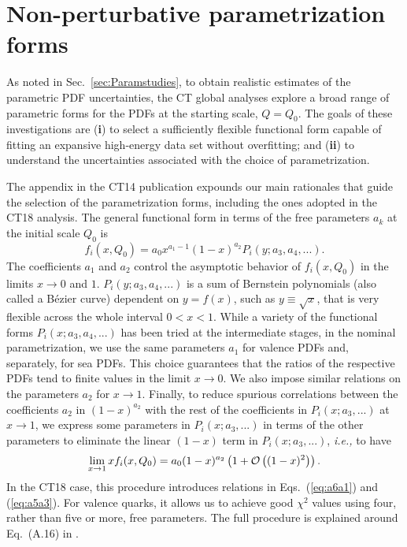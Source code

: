 \section{Non-perturbative parametrization forms}
\label{sec:AppendixParam}

As noted in Sec.~\ref{sec:Paramstudies}, to obtain realistic estimates of the parametric PDF uncertainties, the CT global analyses explore a broad range of parametric forms for the PDFs at the starting scale, $Q\! =\! Q_0$. 
The goals of these investigations are ({\bf i}) to select a sufficiently flexible functional form capable of fitting an expansive high-energy data set without overfitting; and ({\bf ii}) to understand the uncertainties associated with the choice of parametrization. 

The appendix in the CT14 publication \cite{Dulat:2015mca} expounds our main rationales that guide the selection of the parametrization forms, including the ones adopted in the CT18 analysis. The general functional form in terms of the free parameters $a_k$ at the initial scale $Q_0$ is
\begin{equation}
    f_i(x,Q_0) = a_0 x^{a_1-1} (1-x)^{a_2} P_i(y; a_3, a_4,...).
    \label{eq:fiQ0}
\end{equation}
 The coefficients $a_1$ and $a_2$ control the asymptotic behavior of $f_i(x,Q_0)$ in the limits $x\rightarrow 0$ and $1$. $P_i(y;a_3,a_4, ...)$ is a sum of Bernstein polynomials (also called a B\'ezier curve) dependent on $y=f(x)$, such as $y\equiv \sqrt{x}$, that is very flexible across the whole interval $0<x<1$. While a variety of the functional forms $P_i(x; a_3, a_4,...)$ has been tried at the intermediate stages, in the nominal parametrization, we use the same parameters $a_1$ for valence PDFs and, separately, for sea PDFs. This choice guarantees that the ratios of the respective PDFs tend to finite values in the limit $x\to 0$. We also impose similar relations on the parameters $a_2$ for $x\to 1$. Finally, to reduce spurious correlations between the coefficients $a_2$ in $(1-x)^{a_2}$ with the rest of the  coefficients in $P_i(x;a_3,...)$ at $x\rightarrow 1$, we express some parameters in $P_i(x;a_3,...)$ in terms of the other parameters to eliminate the linear $(1-x)$ term in $P_i(x;a_3,...)$, {\it i.e.,} to have  
\begin{equation}
    \lim_{x\to 1} xf_i(x,Q_0) = a_0 (1-x)^{a_2} \left(1 + {\cal O}\left((1-x)^2\right)\right).
    \label{PixTo1}
\end{equation}
In the CT18 case, this procedure introduces relations in Eqs.~(\ref{eq:a6a1}) and (\ref{eq:a5a3}). For valence quarks, it allows us to achieve good $\chi^2$ values using four, rather than five or more, free parameters. The full procedure is explained around Eq.~(A.16) in \cite{Dulat:2015mca}.

